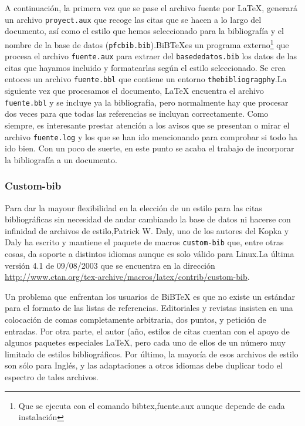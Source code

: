 A continuación, la primera vez que se pase el archivo fuente por \LaTeX{}, generará un archivo \verb|proyect.aux| que recoge las citas que se hacen a lo largo del documento, así como  el estilo que hemos seleccionado  para la bibliografía  y el nombre  de la base de datos (\verb|pfcbib.bib|).BiB\TeX es un programa externo\footnote{Que se ejecuta con el comando bibtex,fuente.aux aunque depende de cada instalación} que procesa el archivo \verb|fuente.aux| para extraer del \verb|basededatos.bib| los datos de las citas que hayamos incluido y formatearlas según el  estilo seleccionado. Se crea entoces un archivo \verb|fuente.bbl| que contiene un entorno \verb|thebibliogragphy|.La siguiente vez que procesamos el documento,  \LaTeX{}  encuentra el archivo \verb|fuente.bbl| y se incluye ya la bibliografía,  pero normalmente hay que procesar dos veces para que todas las referencias se incluyan correctamente. Como siempre, es interesante prestar atención  a los avisos que se presentan o mirar el archivo \verb|fuente.log| y los que se han ido mencionando para comprobar si todo ha ido bien. Con un poco de suerte, en este punto se acaba el trabajo de incorporar  la bibliografía  a un documento.


\subsubsection{Custom-bib}

Para dar la mayour flexibilidad  en la elección de un estilo para las citas bibliográficas sin necesidad de andar cambiando la base de datos ni hacerse con infinidad de archivos de estilo,Patrick W. Daly, uno de los autores del Kopka y Daly \cite{guidek} ha escrito y mantiene el paquete de macros \verb|custom-bib| que, entre otras cosas, da soporte a distintos idiomas aunque es solo válido para Linux.La última versión 4.1 de 09/08/2003 que se encuentra en la dirección \url{http://www.ctan.org/tex-archive/macros/latex/contrib/custom-bib}.

Un problema que enfrentan los usuarios de BiB\TeX{} es que no existe un estándar para el formato de las listas de referencias. Editoriales y revistas insisten en una colocación de comas completamente arbitraria, dos puntos, y petición de entradas. Por otra parte, el autor (año, estilos de citas cuentan con el apoyo de algunos paquetes especiales \LaTeX{}, pero cada uno de ellos de un número muy limitado de estilos bibliográficos. Por último, la mayoría de esos archivos de estilo son sólo para Inglés, y las adaptaciones a otros idiomas debe duplicar todo el espectro de tales archivos.
	
